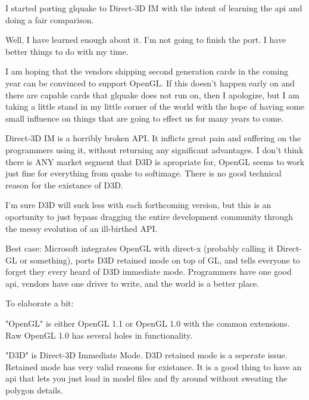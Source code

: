 \begin{allintypewriter}
\par
I started porting glquake to Direct-3D IM with the intent of learning the api
and doing a fair comparison.\\ 
\par
Well, I have learned enough about it. I'm not going to finish the port. I have
better things to do with my time.\\ 
\par
I am hoping that the vendors shipping second generation cards in the coming 
year can be convinced to support OpenGL. If this doesn't happen early on and
there are capable cards that glquake does not run on, then I apologize, but I am
taking a little stand in my little corner of the world with the hope of having 
some small influence on things that are going to effect us for many years to come.\\ 
\par
Direct-3D IM is a horribly broken API. It inflicts great pain and suffering on 
the programmers using it, without returning any significant advantages. I don't 
think there is ANY market segment that D3D is apropriate for, OpenGL seems to work
just fine for everything from quake to softimage. There is no good technical reason
for the existance of D3D.\\ 
\par
I'm sure D3D will suck less with each forthcoming version, but this is an oportunity 
to just bypass dragging the entire development community through the messy evolution 
of an ill-birthed API.\\ 
\par
Best case: Microsoft integrates OpenGL with direct-x (probably calling it Direct-GL 
or something), ports D3D retained mode on top of GL, and tells everyone to forget 
they every heard of D3D immediate mode. Programmers have one good api, vendors have 
one driver to write, and the world is a better place.\\ 
\par
To elaborate a bit:\\ 
\par
"OpenGL" is either OpenGL 1.1 or OpenGL 1.0 with the common extensions. Raw OpenGL 1.0
has several holes in functionality.\\ 
\par
"D3D" is Direct-3D Immediate Mode. D3D retained mode is a seperate issue. Retained 
mode has very valid reasons for existance. It is a good thing to have an api that 
lets you just load in model files and fly around without sweating the polygon details. 

\end{allintypewriter}
